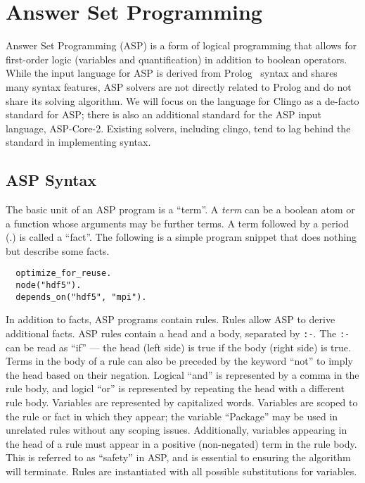 \section{Answer Set Programming}
\label{sec:asp}

Answer Set Programming (ASP) is a form of logical programming that allows for first-order logic (variables and quantification) in addition to boolean operators.
While the input language for ASP is derived from Prolog~\cite{baral_2003} syntax and shares many syntax features, ASP solvers are not directly related to Prolog and do not share its solving algorithm.
We will focus on the language for Clingo as a de-facto standard for ASP; there is also an additional standard for the ASP input language, ASP-Core-2.
Existing solvers, including clingo, tend to lag behind the standard in implementing syntax.

\subsection{ASP Syntax}

The basic unit of an ASP program is a ``term''.
A \textit{term} can be a boolean atom or a function whose arguments may be further terms.
A term followed by a period (.) is called a ``fact''.
The following is a simple program snippet that does nothing but describe some facts.

\begin{verbatim}
  optimize_for_reuse.
  node("hdf5").
  depends_on("hdf5", "mpi").
\end{verbatim}

In addition to facts, ASP programs contain rules.
Rules allow ASP to derive additional facts.
ASP rules contain a head and a body, separated by \texttt{:-}.
The \texttt{:-} can be read as ``if'' --- the head (left side) is true if the body (right side) is true.
Terms in the body of a rule can also be preceded by the keyword ``not'' to imply the head based on their negation.
Logical ``and'' is represented by a comma in the rule body, and logicl ``or'' is represented by repeating the head with a different rule body.
Variables are represented by capitalized words.
Variables are scoped to the rule or fact in which they appear; the variable ``Package'' may be used in unrelated rules without any scoping issues.
Additionally, variables appearing in the head of a rule must appear in a positive (non-negated) term in the rule body.
This is referred to as ``safety'' in ASP, and is essential to ensuring the algorithm will terminate.
Rules are instantiated with all possible substitutions for variables.

